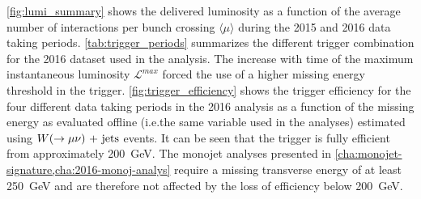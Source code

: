 \cref{fig:lumi_summary} shows the delivered luminosity as a function of the
average number of interactions per bunch crossing $\langle \mu \rangle$ during
the 2015 and 2016 data taking periods. \cref{tab:trigger_periods} summarizes the
different trigger combination for the 2016 dataset used in the analysis. The
increase with time of the maximum instantaneous luminosity $\mathcal{L}^{max}$
forced the use of a higher missing energy threshold in the
trigger. \cref{fig:trigger_efficiency} shows the trigger efficiency for the four
different data taking periods in the 2016 analysis as a function of the missing
energy as evaluated offline (i.e.\@ the same variable used in the analyses)
estimated using $W (\rightarrow \mu \nu)\mathrm{~+~jets}$ events. It can be seen that the trigger is
fully efficient from approximately 200~GeV. The monojet analyses presented in
\cref{cha:monojet-signature,cha:2016-monoj-analys} require a missing transverse
energy of at least 250~GeV and are therefore not affected by the loss of
efficiency below 200~GeV.
\begin{table}[!ht]
  \centering
\caption{The table reports the trigger used in the 2016 data taking. The maximum
  instantaneous luminosity $\mathcal{L}^{max} (10^{30} cm^{-2}s^{-1})$ is also
  reported. The constant increasing of $\mathcal{L}^{max}$ justifies the choice
  of higher $\met$ thresholds for the trigger.}
  \label{tab:trigger_periods}
\end{table}
